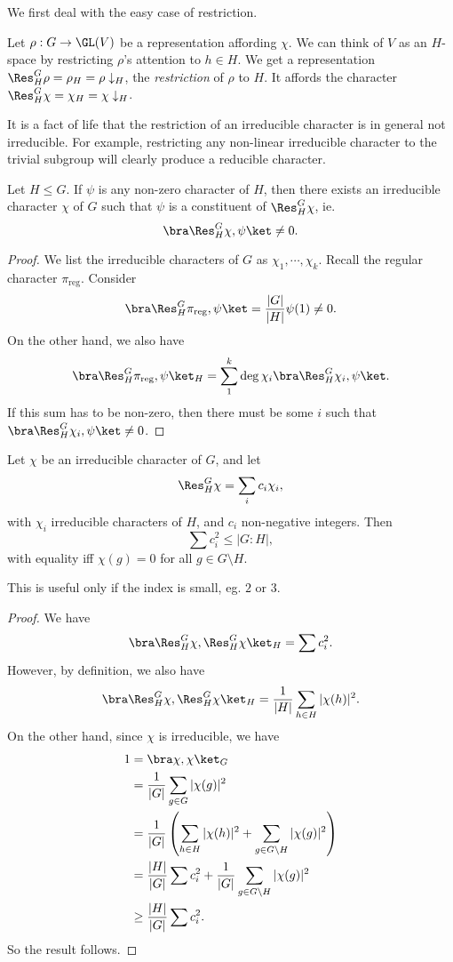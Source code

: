 \documentclass[a4paper]{article}
\begin{document}
We first deal with the easy case of restriction.
\begin{defi}[Restriction]
  Let $\rho: G \to \GL(V)$ be a representation affording $\chi$. We can think of $V$ as an $H$-space by restricting $\rho$'s attention to $h \in H$. We get a representation $\Res^G_H \rho = \rho_H = \rho\downarrow_H$, the \emph{restriction} of $\rho$ to $H$. It affords the character $\Res^G_H \chi = \chi_H = \chi\downarrow_H$.
\end{defi}
It is a fact of life that the restriction of an irreducible character is in general not irreducible. For example, restricting any non-linear irreducible character to the trivial subgroup will clearly produce a reducible character.

\begin{lemma}
  Let $H \leq G$. If $\psi$ is any non-zero character of $H$, then there exists an irreducible character $\chi$ of $G$ such that $\psi$ is a constituent of $\Res_H^G \chi$, ie.
  \[
    \bra \Res^G_H \chi, \psi \ket \not= 0.
  \]
\end{lemma}

\begin{proof}
  We list the irreducible characters of $G$ as $\chi_1, \cdots, \chi_k$. Recall the regular character $\pi_{\mathrm{reg}}$. Consider
  \[
    \bra \Res^G_H\pi_{\mathrm{reg}}, \psi\ket = \frac{|G|}{|H|} \psi(1) \not= 0.
  \]
  On the other hand, we also have
  \[
    \bra \Res^G_H\pi_{\mathrm{reg}}, \psi\ket_H = \sum_{1}^k \deg \chi_i \bra \Res^G_H \chi_i, \psi\ket.
  \]
  If this sum has to be non-zero, then there must be some $i$ such that $\bra \Res^G_H \chi_i, \psi\ket \not= 0$.
\end{proof}

\begin{lemma}
  Let $\chi$ be an irreducible character of $G$, and let
  \[
    \Res^G_H \chi = \sum_i c_i \chi_i,
  \]
  with $\chi_i$ irreducible characters of $H$, and $c_i$ non-negative integers. Then
  \[
    \sum c_i^2 \leq |G:H|,
  \]
  with equality iff $\chi(g) = 0$ for all $g \in G\setminus H$.
\end{lemma}
This is useful only if the index is small, eg. $2$ or $3$.
\begin{proof}
  We have
  \[
    \bra \Res^G_H \chi, \Res^G_H \chi\ket_H = \sum c_i^2.
  \]
  However, by definition, we also have
  \[
    \bra \Res^G_H \chi, \Res^G_H \chi\ket_H = \frac{1}{|H|}\sum_{h \in H} |\chi(h)|^2.
  \]
  On the other hand, since $\chi$ is irreducible, we have
  \begin{align*}
    1 &= \bra \chi, \chi\ket_G\\
    &= \frac{1}{|G|}\sum_{g \in G} |\chi(g)|^2 \\
    &= \frac{1}{|G|} \left(\sum_{h \in H} |\chi(h)|^2 + \sum_{g \in G\setminus H} |\chi(g)|^2\right)\\
    &= \frac{|H|}{|G|} \sum c_i^2 + \frac{1}{|G|} \sum_{g \in G \setminus H} |\chi(g)|^2\\
    &\geq \frac{|H|}{|G|} \sum c_i^2.
  \end{align*}
  So the result follows.
\end{proof}
\end{document}
